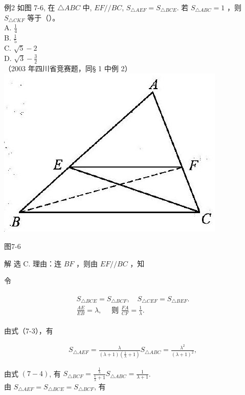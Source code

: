 \documentclass[10pt]{article}
\begin{document}
例2 如图 7-6, 在 $\triangle A B C$ 中, $E F / / B C$, $S_{\triangle A E F}=S_{\triangle B C E}$. 若 $S_{\triangle A B C}=1$ ，则 $S_{\triangle C K F}$ 等于（）。\\
A. $\frac{1}{4}$\\
B. $\frac{1}{5}$\\
C. $\sqrt{5}-2$\\
D. $\sqrt{3}-\frac{3}{2}$\\
（2003 年四川省竞赛题，同§ 1 中例 2）\\
\includegraphics[max width=\textwidth, center]{2024_10_30_2c8f45efd4a519b08e1ag-078}

图7-6

解 选 C. 理由：连 $B F$ ，则由 $E F / / B C$ ，知

令

\begin{align*}
\begin{gathered}
S_{\triangle B C E}=S_{\triangle B C F}, \quad S_{\triangle C E F}=S_{\triangle B E F} . \\
\frac{A E}{E B}=\lambda, \quad \text { 则 } \frac{F A}{C F}=\frac{1}{\lambda} .
\end{gathered}
\end{align*}

由式（7-3），有

\begin{align*}
S_{\triangle A E F}=\frac{\lambda}{(\lambda+1)\left(\frac{1}{\lambda}+1\right)} S_{\triangle A B C}=\frac{\lambda^{2}}{(\lambda+1)^{2}},
\end{align*}

由式 $(7-4)$, 有 $S_{\triangle B C F}=\frac{\frac{1}{\lambda}}{\frac{1}{\lambda}+1} S_{\triangle A B C}=\frac{1}{\lambda+1}$.\\
由 $S_{\triangle A E F}=S_{\triangle B C E}=S_{\triangle B C F}$, 有
\end{document}
